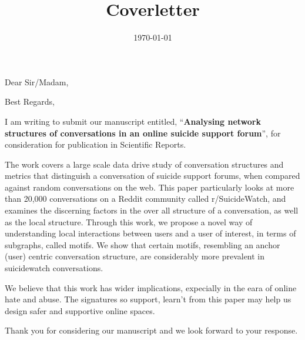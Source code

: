 \documentclass[11pt,a4paper,roman]{moderncv}        %
\title{Coverletter}                               %
\begin{document}
    \date{\today}
    \opening{Dear Sir/Madam,}
    \closing{Best Regards,}
    \makelettertitle
    
    
   I am writing to submit our manuscript entitled, ``\textbf{Analysing network structures of conversations in an online suicide support forum}'', for consideration for publication in Scientific Reports.
   
   The work covers a large scale data drive study of conversation structures and metrics that distinguish a conversation of suicide support forums, when compared against random conversations on the web. 
   This paper particularly looks at more than 20,000 conversations on a Reddit community called r/SuicideWatch, and examines the discerning factors in the over all structure of a conversation, as well as the local structure. 
   Through this work, we propose a novel way of understanding local interactions between users and a user of interest, in terms of subgraphs, called motifs. We show that certain motifs, resembling an anchor (user) centric conversation structure, are considerably more prevalent in suicidewatch conversations.
   
   We believe that this work has wider implications, expecially in the eara of online hate and abuse. The signatures so support, learn't from this paper may help us design safer and supportive online spaces.
  
   Thank you for considering our manuscript and we look forward to your response.
    
    
    \vspace{0.5cm}
    
    
    \makeletterclosing
    
\end{document}

